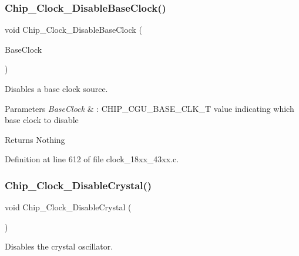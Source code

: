 \subsubsection{\texorpdfstring{Chip\+\_\+\+Clock\+\_\+\+Disable\+Base\+Clock()}{Chip\_Clock\_DisableBaseClock()}}
{\footnotesize\ttfamily void Chip\+\_\+\+Clock\+\_\+\+Disable\+Base\+Clock (\begin{DoxyParamCaption}\item[{\hyperlink{chip__clocks_8h_a31e266dd83cc66eb866d8d051ffd1d45}{C\+H\+I\+P\+\_\+\+C\+G\+U\+\_\+\+B\+A\+S\+E\+\_\+\+C\+L\+K\+\_\+T}}]{Base\+Clock }\end{DoxyParamCaption})}



Disables a base clock source. 


\begin{DoxyParams}{Parameters}
{\em Base\+Clock} & \+: C\+H\+I\+P\+\_\+\+C\+G\+U\+\_\+\+B\+A\+S\+E\+\_\+\+C\+L\+K\+\_\+T value indicating which base clock to disable \\
\hline
\end{DoxyParams}
\begin{DoxyReturn}{Returns}
Nothing 
\end{DoxyReturn}


Definition at line 612 of file clock\+\_\+18xx\+\_\+43xx.\+c.

\mbox{\label{group___c_l_o_c_k__18_x_x__43_x_x_gadbc79ec252fc8518b284aff51e86adf5}} 
\subsubsection{\texorpdfstring{Chip\+\_\+\+Clock\+\_\+\+Disable\+Crystal()}{Chip\_Clock\_DisableCrystal()}}
{\footnotesize\ttfamily void Chip\+\_\+\+Clock\+\_\+\+Disable\+Crystal (\begin{DoxyParamCaption}\item[{void}]{ }\end{DoxyParamCaption})}



Disables the crystal oscillator. 

